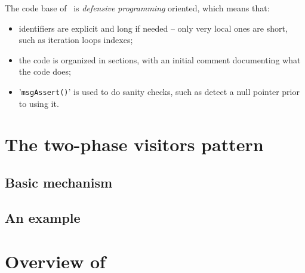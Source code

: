 \documentclass[12pt,a4paper]{article}
\begin{document}
The code base of \xmlToLy\ is {\it defensive programming} oriented, which means that:
\begin{itemize}
\item identifiers are explicit and long if needed -- only very local ones are short, such as iteration loops indexes;

\item the code is organized in sections, with an initial comment documenting what the code does;

\item '{\tt msgAssert()}' is used to do sanity checks, such as detect a null pointer prior to using it.
\end{itemize}


\section{The two-phase visitors pattern}

\subsection{Basic mechanism}

\subsection{An example}


\section{Overview of \xmlToLy\ }
\end{document}
